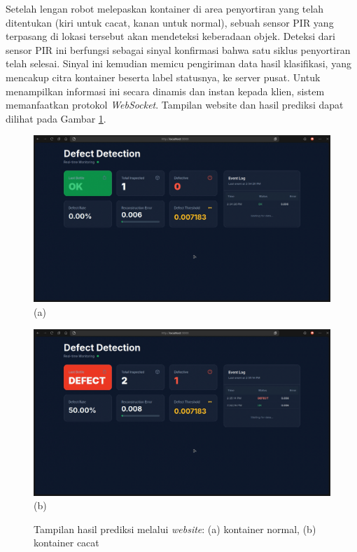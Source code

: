Setelah lengan robot melepaskan kontainer di area penyortiran yang
telah ditentukan (kiri untuk cacat, kanan untuk normal), sebuah
sensor PIR yang terpasang di lokasi tersebut akan
mendeteksi keberadaan objek. Deteksi dari sensor PIR ini berfungsi
sebagai sinyal konfirmasi bahwa satu siklus penyortiran telah
selesai. Sinyal ini kemudian memicu pengiriman data hasil
klasifikasi, yang mencakup citra kontainer beserta label statusnya,
ke server pusat. Untuk menampilkan informasi ini secara dinamis dan
instan kepada klien, sistem memanfaatkan protokol \textit{WebSocket}.
Tampilan website dan hasil prediksi dapat dilihat pada Gambar
\ref{fig:web-test}.

\begin{figure}[H]
  \centering
  \begin{minipage}{0.8\textwidth}
    \centering
    \includegraphics[width=\textwidth]{gambar/web_ss_normal.png}
    (a)
  \end{minipage}
  \vspace{1em}

  \begin{minipage}{0.8\textwidth}
    \centering
    \includegraphics[width=\textwidth]{gambar/web_ss_cacat.png}
    (b)
  \end{minipage}
  \centering
  \caption{Tampilan hasil prediksi melalui \textit{website}: (a)
  kontainer normal, (b) kontainer cacat}
  \label{fig:web-test}
  \vspace{-1em}
\end{figure}

